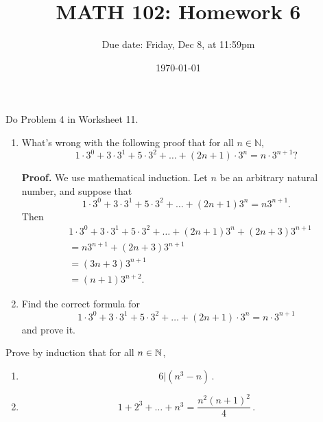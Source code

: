 \documentclass[12pt]{amsart}
\title{ MATH 102: Homework 6}
\author{Due date: Friday, Dec 8, at 11:59pm }
\date{\today}
\begin{document}
\maketitle

\begin{problem}
    Do Problem 4 in Worksheet 11.
\end{problem}

\begin{problem}
    \begin{enumerate}
        \item 
    What's wrong with the following proof that for all \(n \in \mathbb{N}\), 
\[ 1 \cdot 3^0 + 3 \cdot 3^1 + 5 \cdot 3^2 + \ldots + (2n+1) \cdot 3^n = n \cdot 3^{n+1}? \]

\textbf{Proof.} We use mathematical induction. Let \(n\) be an arbitrary natural number, and suppose that 
\[ 1 \cdot 3^0 + 3 \cdot 3^1 + 5 \cdot 3^2 + \ldots + (2n + 1)3^n = n3^{n+1}. \]
Then
\begin{align*}
&1 \cdot 3^0 + 3 \cdot 3^1 + 5 \cdot 3^2 + \ldots + (2n+1)3^n + (2n+3)3^{n+1} \\
&= n3^{n+1} + (2n + 3)3^{n+1} \\
&= (3n + 3)3^{n+1} \\
&= (n + 1)3^{n+2}.
\end{align*}

\item Find the correct formula for  
\[ 1 \cdot 3^0 + 3 \cdot 3^1 + 5 \cdot 3^2 + \ldots + (2n+1) \cdot 3^n = n \cdot 3^{n+1} \]
    and prove it.
    \end{enumerate}
\end{problem}

\begin{problem}
    Prove by induction that for all $n\in \mathbb{N}$, 
    \begin{enumerate}
        \item 
    \begin{equation*}
        6 \vert (n^3 - n) \,.
    \end{equation*}
\item \begin{equation*}
        1+2^3 + \dots + n^3 = \frac{n^2(n+1)^2}{4}\,.
\end{equation*}
    \end{enumerate}
\end{problem}
\end{document}
